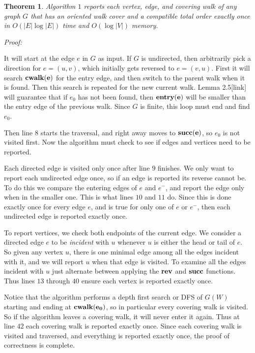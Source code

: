 \documentclass[11pt]{article}
\newcommand{\rev}{\bf rev}
\newcommand{\suc}{\bf succ}
\newcommand{\cwalk}{\bf cwalk}
\newcommand{\entry}{\bf entry}
\newtheorem{theorem}{Theorem}[section]
\begin{document}
\begin{theorem}
Algorithm $1$ reports each vertex, edge, and covering walk of any graph $G$ that has an 
oriented walk cover and a compatible total order exactly once in $O(|E| \log |E|)$ time and 
$O(\log |V|)$ memory. 
\end{theorem}

\emph{Proof:}

It will start at the edge $e$ in $G$ as input.  If $G$ is undirected, then arbitrarily pick 
a direction for $e=(u,v)$, which initially gets reversed to $e=(v,u)$.  
First it will search $\cwalk(e)$ for the entry edge, and then switch to the 
parent walk when it is found.  Then this search is repeated for the new current walk.  Lemma 
2.5[link] will guarantee that if $e_0$ has not been found, then $\entry(e)$ will be 
smaller than the entry edge of the previous walk.  Since $G$ is finite, this loop must end 
and find $e_0$.  

Then line $8$ starts the traversal, and right away moves to $\suc(e)$, so $e_0$ is not visited 
first.   Now the algorithm must check to see if edges and vertices need to be reported.  

Each directed edge is visited only once after line $9$ finishes.  We only 
want to report each undirected edge once, so if an edge is reported 
its reverse cannot be.  To do this we compare the entering edges of 
$e$ and $e^-$, and report the edge only when in the smaller one.  This is what lines 
$10$ and $11$ do.  Since this is done exactly once for every edge $e$, and is true for 
only one of $e$ or $e^-$, then each undirected edge is reported exactly once.  

To report vertices, we check both endpoints of the current edge.  
We consider a directed edge $e$ to be \emph{incident} with $u$ whenever 
$u$ is either the head or tail of $e$.  So given any vertex $u$, there is one 
minimal edge among all the edges incident with it, and we will report $u$ when 
that edge is visited.  To examine all the edges incident with $u$ just alternate 
between applying the $\rev$ and $\suc$ functions.  Thus lines $13$ through $40$ ensure 
each vertex is reported exactly once.  

Notice that the algorithm  performs a depth first 
search or DFS of $G(W)$ starting and ending at $\cwalk(e_0)$, so in particular 
every covering walk is visited.  So if the algorithm leaves a covering walk, it will 
never enter it again.  Thus at line $42$ each covering walk is reported exactly once.  
Since each covering walk is visited and traversed, and everything is reported exactly once, the proof 
of correctness is complete.  
\end{document}
